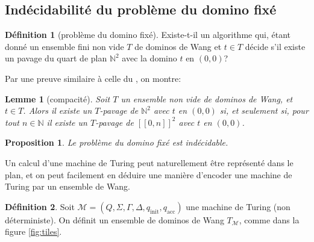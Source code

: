 \documentclass{scrartcl}
\newcommand{\N}{\mathbb N}
\newtheorem{lemme}{Lemme}
\newtheorem{proposition}{Proposition}
\theoremstyle{definition}
\newtheorem{definition}{Définition}
\theoremstyle{remark}
\begin{document}
\subsection{Indécidabilité du problème du domino fixé}

\begin{definition}[problème du domino fixé]
  Existe-t-il un algorithme qui, étant donné un ensemble fini non vide $T$ de dominos de Wang et $t\in T$ décide s'il existe un pavage du quart de plan $\N^2$ avec la domino $t$ en $(0,0)$?
\end{definition}

Par une preuve similaire à celle du , on montre:

\begin{lemme}[compacité]
  Soit $T$ un ensemble non vide de dominos de Wang, et $t\in T$. Alors il existe un $T$-pavage de $\N^2$ avec $t$ en $(0,0)$ si, et seulement si, pour tout $n\in\N$ il existe un $T$-pavage de $[\![0,n]\!]^2$ avec $t$ en $(0,0)$.
\end{lemme}

\begin{proposition}
  Le problème du domino fixé est indécidable.
\end{proposition}

Un calcul d'une machine de Turing peut naturellement être représenté dans le plan, et on peut facilement en déduire une manière d'encoder une machine de Turing par un ensemble de Wang. 

\begin{definition}
  Soit $\mathcal M=(Q,\Sigma,\Gamma,\Delta,q_{\mathrm{init}}, q_{\mathrm{acc}})$ une machine de Turing (non déterministe). On définit un ensemble de dominos de Wang $T_\mathcal M$, comme dans la figure \ref{fig:tiles}.
\end{definition}
\end{document}
